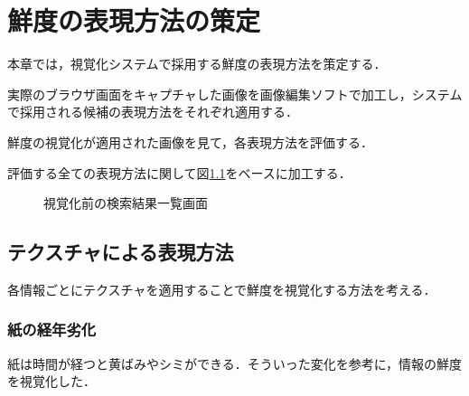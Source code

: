 \chapter{鮮度の表現方法の策定}
\label{chap:verification}

本章では，視覚化システムで採用する鮮度の表現方法を策定する．

実際のブラウザ画面をキャプチャした画像を画像編集ソフトで加工し，システムで採用される候補の表現方法をそれぞれ適用する．

鮮度の視覚化が適用された画像を見て，各表現方法を評価する．

\newpage

評価する全ての表現方法に関して図\ref{fig:ver-base}をベースに加工する．

\begin{figure}[htbp]
  \begin{center}
  \end{center}
  \caption{視覚化前の検索結果一覧画面}
  \label{fig:ver-base}
\end{figure}


\section{テクスチャによる表現方法}
\label{sec:ver-texture}

各情報ごとにテクスチャを適用することで鮮度を視覚化する方法を考える．

\subsection{紙の経年劣化}
\label{subsec:ver-tex-sheet}

紙は時間が経つと黄ばみやシミができる．そういった変化を参考に，情報の鮮度を視覚化した．


